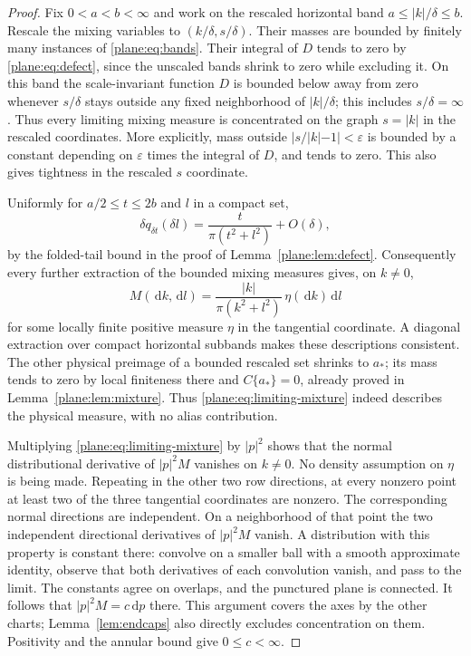 \documentclass[11pt]{article}
\theoremstyle{definition}
\theoremstyle{remark}
\numberwithin{equation}{section}
\begin{document}
\begin{proof}
Fix $0<a<b<\infty$ and work on the rescaled horizontal band
$a\le|k|/\delta\le b$.  Rescale the mixing variables to
$(k/\delta,s/\delta)$.  Their masses are bounded by finitely many
instances of \eqref{plane:eq:bands}.  Their integral of $D$ tends to
zero by \eqref{plane:eq:defect}, since the unscaled bands shrink to
zero while excluding it.  On this band the scale-invariant function
$D$ is bounded below away from zero whenever $s/\delta$ stays outside
any fixed neighborhood of $|k|/\delta$; this includes $s/\delta=\infty$.
Thus every limiting mixing measure is concentrated on the graph
$s=|k|$ in the rescaled coordinates.  More explicitly, mass outside
$|s/|k|-1|<\varepsilon$ is bounded by a constant depending on
$\varepsilon$ times the integral of $D$, and tends to zero.
This also gives tightness in the rescaled $s$ coordinate.

Uniformly for $a/2\le t\le2b$ and $l$ in a compact set,
\[
 \delta q_{\delta t}(\delta l)
     =\frac{t}{\pi(t^2+l^2)}+O(\delta),
\]
by the folded-tail bound in the proof of
Lemma~\ref{plane:lem:defect}.  Consequently every further extraction
of the bounded mixing measures gives, on $k\ne0$,
\begin{equation}
 \label{plane:eq:limiting-mixture}
 M(\,\mathrm d k,\,\mathrm d l)=
     \frac{|k|}{\pi(k^2+l^2)}\,\eta(\,\mathrm d k)\,\mathrm d l
\end{equation}
for some locally finite positive measure $\eta$ in the tangential
coordinate.  A diagonal extraction over compact horizontal subbands
makes these descriptions consistent.  The other physical preimage of
a bounded rescaled set shrinks to $a_*$; its mass tends to zero by
local finiteness there and $C\{a_*\}=0$, already proved in
Lemma~\ref{plane:lem:mixture}.  Thus \eqref{plane:eq:limiting-mixture}
indeed describes the physical measure, with no alias contribution.

Multiplying \eqref{plane:eq:limiting-mixture} by $|p|^2$ shows that
the normal distributional derivative of $|p|^2M$ vanishes on $k\ne0$.
No density assumption on $\eta$ is being made.  Repeating in the
other two row directions, at every nonzero point at least two
of the three tangential coordinates are nonzero.  The corresponding
normal directions are independent.  On a neighborhood of that point
the two independent directional derivatives of $|p|^2M$ vanish.
A distribution with this property is constant there: convolve on a
smaller ball with a smooth approximate identity, observe that both
derivatives of each convolution vanish, and pass to the limit.
The constants agree on overlaps, and the punctured plane is connected.
It follows that $|p|^2M=c\,\mathrm d p$ there.  This argument covers the
axes by the other charts; Lemma~\ref{lem:endcaps} also directly
excludes concentration on them.  Positivity and the annular bound
give $0\le c<\infty$.
\end{proof}
\end{document}
